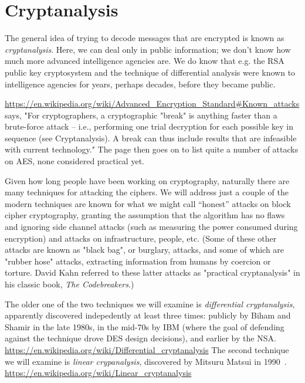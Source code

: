 \section{Cryptanalysis}
\label{sec:cryptan}


The general idea of trying to decode messages that are encrypted is
known as \emph{cryptanalysis}.  Here, we can deal only in public information;
we don't know how much more advanced intelligence agencies are.  We do
know that e.g. the RSA public key cryptosystem and the technique of
differential analysis were known to intelligence agencies for years,
perhaps decades, before they became public. 

\url{https://en.wikipedia.org/wiki/Advanced_Encryption_Standard#Known_attacks}
says, "For cryptographers, a cryptographic "break" is anything faster
than a brute-force attack – i.e., performing one trial decryption for
each possible key in sequence (see Cryptanalysis). A break can thus
include results that are infeasible with current technology."
The page then goes on to list quite a number of attacks on AES, none
considered practical yet.

Given how long people have been working on cryptography, naturally
there are many techniques for attacking the ciphers.  We will address
just a couple of the modern techniques are known for what we might
call ``honest'' attacks on block cipher cryptography, granting the
assumption that the algorithm has no flaws and ignoring side channel
attacks (such as measuring the power consumed during encryption) and
attacks on infrastructure, people, etc.  (Some of these other attacks
are known as "black bag", or burglary, attacks, and some of which are
"rubber hose" attacks, extracting information from humans by coercion
or torture.  David Kahn referred to these latter attacks as
"practical cryptanalysis" in his classic book, \emph{The
  Codebreakers}.)

The older one of the two techniques we will examine is
\emph{differential cryptanalysis}, apparently discovered indepedently
at least three times: publicly by Biham and Shamir in the late 1980s,
in the mid-70s by IBM (where the goal of defending against the
technique drove DES design decisions), and earlier by the NSA.
\url{https://en.wikipedia.org/wiki/Differential_cryptanalysis} The
second technique we will examine is \emph{linear crypanalysis},
discovered by Mitsuru Matsui in 1990~\cite{matsui1993linear}.
\url{https://en.wikipedia.org/wiki/Linear_cryptanalysis}

